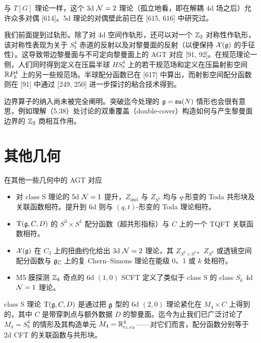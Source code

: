 与 $T[G]$ 理论一样，这个 3d $\mathcal{N}=2$ 理论（孤立地看，即在解耦 4d 场之后）允许众多对偶 [614]。5d 理论的对偶壁此前已在 [615, 616] 中研究过。

我们前面提到过轨形。除了对 4d 空间作轨形，还可以对一个 $\mathbb{Z}_2$ 对称性作轨形，该对称性表现为关于 $S^4_b$ 赤道的反射以及对黎曼面的反射（以便保持 $\mathcal{X}(\mathfrak{g})$ 的手征性）。这导致带边黎曼面与不可定向黎曼面上的 AGT 对应 [91, 92]。在规范理论一侧，人们同时得到定义在压扁半球 $HS^4_b$ 上的若干规范场和定义在压扁射影空间 $\mathbb{R} P^4_b$ 上的另一些规范场。半球配分函数已在 [617] 中算出，而射影空间配分函数则在 [91] 中通过 [249, 250] 进一步探讨的粘合技术得到。

边界算子的纳入尚未被完全阐明。突破迄今处理的 $\mathfrak{g}=\mathfrak{su}(N)$ 情形也会很有意思，例如理解（5.38）处讨论的双重覆盖（double-cover）构造如何与产生黎曼面边界的 $\mathbb{Z}_2$ 商相互作用。

\section{其他几何}

\begin{keybox}{在其他一些几何中的 AGT 对应}
\begin{itemize}[leftmargin=1.4em,itemsep=1pt,topsep=1pt]
  \item 对 class S 理论的 5d $\mathcal{N}=1$ 提升，$Z_{\text{inst}}$ 与 $Z_{S^5}$ 均与 $q$-形变的 Toda 共形块及关联函数相符。提升到 6d 则与 $(q,t)$-形变的 Toda 理论相符。
  \item $\mathrm{T}(\mathfrak{g},C,D)$ 的 $S^3\times S^1$ 配分函数（超共形指标）与 $C$ 上的一个 TQFT 关联函数相符。
  \item $\mathcal{X}(\mathfrak{g})$ 在 $C_3$ 上的扭曲约化给出 3d $\mathcal{N}=2$ 理论，其 $Z_{S^2\times S^1}$、$Z_{S^3}$ 或透镜空间配分函数与 $\mathfrak{g}_{\mathbb{C}}$ 上的复 Chern--Simons 理论在能级 0、1 或 $k$ 处相符。
  \item M5 膜探测 $\mathbb{Z}_k$ 奇点的 6d $(1,0)$ SCFT 定义了类似于 class S 的 class $S_k$ 4d $\mathcal{N}=1$ 理论。
\end{itemize}
\end{keybox}

class S 理论 $\mathrm{T}(\mathfrak{g},C,D)$ 是通过把 $\mathfrak{g}$ 型的 6d $(2,0)$ 理论紧化在 $M_4\times C$ 上得到的，其中 $C$ 是带穿刺点与额外数据 $D$ 的黎曼面。迄今为止我们已广泛讨论了 $M_4=S^4_b$ 的情形及其构造单元 $M_4=\mathbb{R}^4_{\epsilon_1,\epsilon_2}$------对它们而言，配分函数分别等于 2d CFT 的关联函数与共形块。

